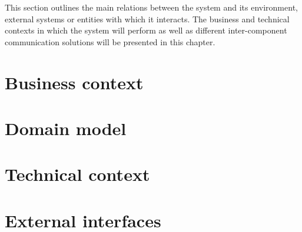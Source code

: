 
This section outlines the main relations between the system and its environment, external systems or entities with which it interacts. The business and technical contexts in which the system will perform as well as different inter-component communication solutions will be presented in this chapter.

\section{Business context}
\label{sec:business_context}


\section{Domain model}
\label{sec:domain_model}


\section{Technical context}
\label{sec:technical_context}


\section{External interfaces}
\label{sec:ext_interfaces}
